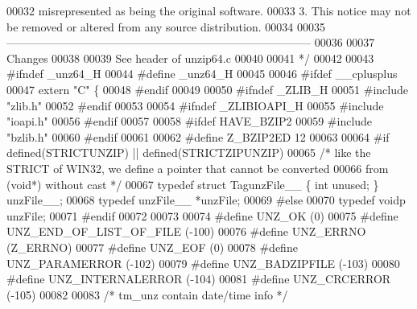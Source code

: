 \begin{DoxyCode}
00032 \textcolor{comment}{     misrepresented as being the original software.}
00033 \textcolor{comment}{  3. This notice may not be removed or altered from any source distribution.}
00034 \textcolor{comment}{}
00035 \textcolor{comment}{  ---------------------------------------------------------------------------------}
00036 \textcolor{comment}{}
00037 \textcolor{comment}{        Changes}
00038 \textcolor{comment}{}
00039 \textcolor{comment}{        See header of unzip64.c}
00040 \textcolor{comment}{}
00041 \textcolor{comment}{*/}
00042 
00043 \textcolor{preprocessor}{#ifndef \_unz64\_H}
00044 \textcolor{preprocessor}{#define \_unz64\_H}
00045 
00046 \textcolor{preprocessor}{#ifdef \_\_cplusplus}
00047 \textcolor{keyword}{extern} \textcolor{stringliteral}{"C"} \{
00048 \textcolor{preprocessor}{#endif}
00049 
00050 \textcolor{preprocessor}{#ifndef \_ZLIB\_H}
00051 \textcolor{preprocessor}{#include "zlib.h"}
00052 \textcolor{preprocessor}{#endif}
00053 
00054 \textcolor{preprocessor}{#ifndef  \_ZLIBIOAPI\_H}
00055 \textcolor{preprocessor}{#include "ioapi.h"}
00056 \textcolor{preprocessor}{#endif}
00057 
00058 \textcolor{preprocessor}{#ifdef HAVE\_BZIP2}
00059 \textcolor{preprocessor}{#include "bzlib.h"}
00060 \textcolor{preprocessor}{#endif}
00061 
00062 \textcolor{preprocessor}{#define Z\_BZIP2ED 12}
00063 
00064 \textcolor{preprocessor}{#if defined(STRICTUNZIP) || defined(STRICTZIPUNZIP)}
00065 \textcolor{comment}{/* like the STRICT of WIN32, we define a pointer that cannot be converted}
00066 \textcolor{comment}{    from (void*) without cast */}
00067 \textcolor{keyword}{typedef} \textcolor{keyword}{struct }TagunzFile\_\_ \{ \textcolor{keywordtype}{int} unused; \} unzFile\_\_;
00068 \textcolor{keyword}{typedef} unzFile\_\_ *unzFile;
00069 \textcolor{preprocessor}{#else}
00070 \textcolor{keyword}{typedef} voidp unzFile;
00071 \textcolor{preprocessor}{#endif}
00072 
00073 
00074 \textcolor{preprocessor}{#define UNZ\_OK                          (0)}
00075 \textcolor{preprocessor}{#define UNZ\_END\_OF\_LIST\_OF\_FILE         (-100)}
00076 \textcolor{preprocessor}{#define UNZ\_ERRNO                       (Z\_ERRNO)}
00077 \textcolor{preprocessor}{#define UNZ\_EOF                         (0)}
00078 \textcolor{preprocessor}{#define UNZ\_PARAMERROR                  (-102)}
00079 \textcolor{preprocessor}{#define UNZ\_BADZIPFILE                  (-103)}
00080 \textcolor{preprocessor}{#define UNZ\_INTERNALERROR               (-104)}
00081 \textcolor{preprocessor}{#define UNZ\_CRCERROR                    (-105)}
00082 
00083 \textcolor{comment}{/* tm\_unz contain date/time info */}

\end{DoxyCode}
